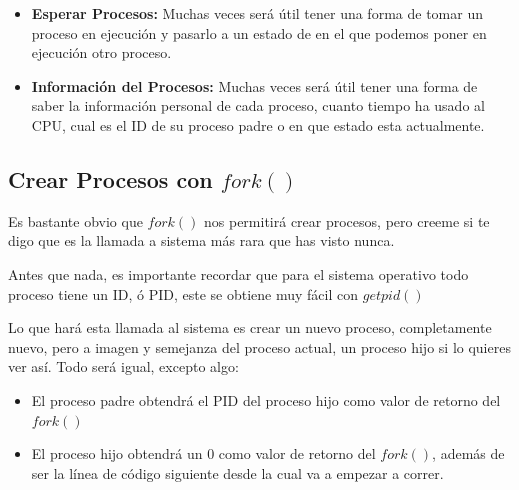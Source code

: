 \documentclass[12pt, fleqn]{report}                             %
\newcommand \Quote {\qq}                                        %
\begin{document}
\begin{itemize}
                    \item
                        \textbf{Esperar Procesos:}
                        Muchas veces será útil tener una forma de tomar un proceso
                        en ejecución y pasarlo a un estado de \Quote{idle} en el
                        que podemos poner en ejecución otro proceso.

                    \item
                        \textbf{Información del Procesos:}
                        Muchas veces será útil tener una forma de saber la información
                        personal de cada proceso, cuanto tiempo ha usado al CPU, cual
                        es el ID de su proceso padre o en que estado esta actualmente.
                 \end{itemize} 


            \clearpage
            \subsection{Crear Procesos con $fork()$}

                Es bastante obvio que $fork()$ nos permitirá crear procesos,
                pero creeme si te digo que es la llamada a sistema más rara que has visto
                nunca.

                Antes que nada, es importante recordar que para el sistema operativo
                todo proceso tiene un ID, ó PID, este se obtiene muy fácil con $getpid()$

                Lo que hará esta llamada al sistema es crear un nuevo proceso, completamente
                nuevo, pero a imagen y semejanza del proceso actual, un proceso hijo
                si lo quieres ver así. Todo será igual, excepto algo:

                \begin{itemize}
                    \item El proceso padre obtendrá el PID del proceso hijo como valor
                        de retorno del $fork()$
                    \item El proceso hijo obtendrá un 0 como valor de retorno del
                    $fork()$, además de ser la línea de código siguiente desde la cual
                    va a empezar a correr.
                \end{itemize}
\end{document}
